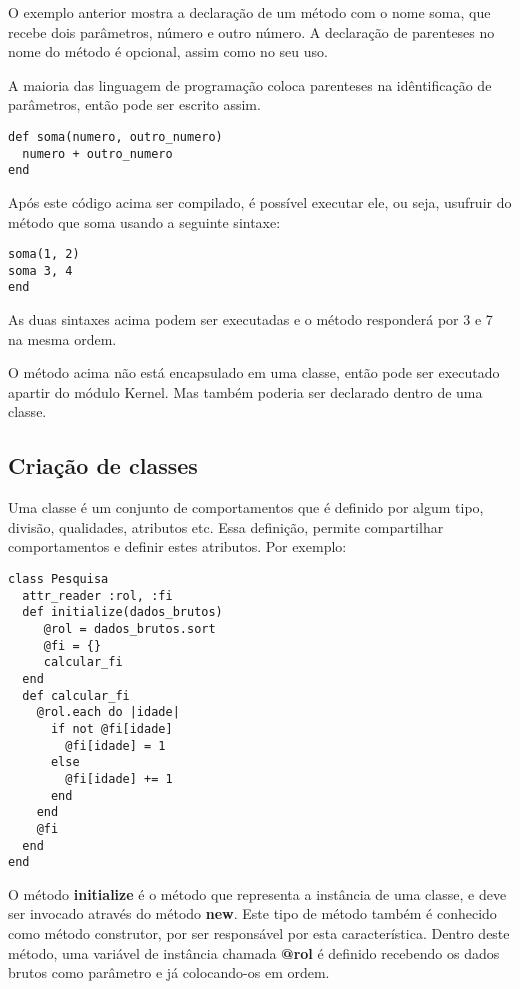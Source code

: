 \documentclass[12pt]{article}
\newcommand{\code}[1] {\textbf{#1}}
\begin{document}
O exemplo anterior mostra a declaração de um método com o nome soma, que recebe dois parâmetros, número e outro número. A declaração de parenteses no nome do método é opcional, assim como no seu uso. 

A maioria das linguagem de programação coloca parenteses na idêntificação de parâmetros, então pode ser escrito assim.

\begin{lstlisting}[caption=implementando um método de soma usando parenteses alternativo]
def soma(numero, outro_numero)
  numero + outro_numero
end
\end{lstlisting}

Após este código acima ser compilado, é possível executar ele, ou seja, usufruir do método que soma usando a seguinte sintaxe:

\begin{lstlisting}[caption=usufruindo do método de soma]
soma(1, 2)
soma 3, 4
end
\end{lstlisting}

As duas sintaxes acima podem ser executadas e o método responderá por 3 e 7 na mesma ordem.

O método acima não está encapsulado em uma classe, então pode ser executado apartir do módulo Kernel. Mas também poderia ser declarado dentro de uma classe.

\subsection{Criação de classes}

Uma classe é um conjunto de comportamentos que é definido por algum tipo, divisão, qualidades, atributos etc. Essa definição, permite compartilhar comportamentos e definir estes atributos. Por exemplo:

\begin{lstlisting}[caption=Criando uma classe, label=classePesquisa]
class Pesquisa
  attr_reader :rol, :fi
  def initialize(dados_brutos)
     @rol = dados_brutos.sort
     @fi = {}
     calcular_fi
  end
  def calcular_fi
    @rol.each do |idade|
      if not @fi[idade]
        @fi[idade] = 1
      else
        @fi[idade] += 1
      end
    end
    @fi
  end
end
\end{lstlisting}

O método \code{initialize} é o método que representa a instância de uma classe, e deve ser invocado através do método \code{new}. Este tipo de método também é conhecido como método construtor, por ser responsável por esta característica. Dentro deste método, uma variável de instância chamada \code{@rol} é definido recebendo os dados brutos como parâmetro e já colocando-os em ordem.
\end{document}
